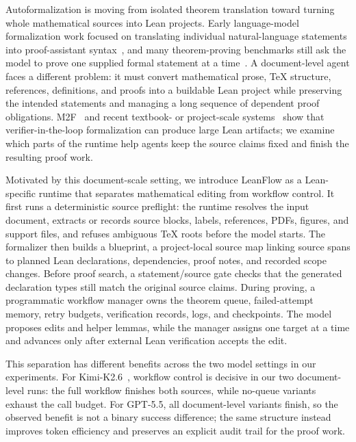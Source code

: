 \documentclass{article}
\newcommand{\method}{LeanFlow\xspace}
\newcommand{\kimi}{Kimi-K2.6\xspace}
\newcommand{\gpt}{GPT-5.5\xspace}
\newcommand{\lean}{Lean\xspace}
\begin{document}
Autoformalization is moving from isolated theorem translation toward turning whole mathematical sources into \lean projects.
Early language-model formalization work focused on translating individual natural-language statements into proof-assistant syntax~\citep{wu2022autoformalization}, and many theorem-proving benchmarks still ask the model to prove one supplied formal statement at a time~\citep{zheng2022minif2f,azerbayev2023proofnet}.
A document-level agent faces a different problem: it must convert mathematical prose, \TeX{} structure, references, definitions, and proofs into a buildable \lean project while preserving the intended statements and managing a long sequence of dependent proof obligations.
M2F~\citep{wang2026m2f} and recent textbook- or project-scale systems~\citep{gloeckle2026automatictextbookformalization,mathinc2025gauss,hariharan2026milestoneformalizationspherepacking,tsoukalas2026advancingmathematicsresearchaidriven} show that verifier-in-the-loop formalization can produce large \lean artifacts; we examine which parts of the runtime help agents keep the source claims fixed and finish the resulting proof work.

Motivated by this document-scale setting, we introduce \method as a \lean-specific runtime that separates mathematical editing from workflow control.
It first runs a deterministic source preflight: the runtime resolves the input document, extracts or records source blocks, labels, references, PDFs, figures, and support files, and refuses ambiguous \TeX{} roots before the model starts.
The formalizer then builds a blueprint, a project-local source map linking source spans to planned \lean declarations, dependencies, proof notes, and recorded scope changes.
Before proof search, a statement/source gate checks that the generated declaration types still match the original source claims.
During proving, a programmatic workflow manager owns the theorem queue, failed-attempt memory, retry budgets, verification records, logs, and checkpoints.
The model proposes edits and helper lemmas, while the manager assigns one target at a time and advances only after external \lean verification accepts the edit.

This separation has different benefits across the two model settings in our experiments.
For \kimi~\citep{moonshot2026kimi}, workflow control is decisive in our two document-level runs: the full workflow finishes both sources, while no-queue variants exhaust the call budget.
For \gpt, all document-level variants finish, so the observed benefit is not a binary success difference; the same structure instead improves token efficiency and preserves an explicit audit trail for the proof work.
\end{document}
